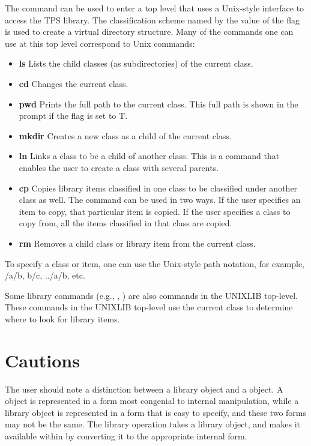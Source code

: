 The command  can be used to enter a top level
that uses a Unix-style interface to access the TPS library.
The classification scheme named by the value of the flag 
is used to create a virtual directory structure.  Many of the commands one
can use at this top level correspond to Unix commands:

\begin{itemize}
\item {\bf ls}  Lists the child classes (as subdirectories) of the current class.

\item {\bf cd}  Changes the current class.

\item {\bf pwd}  Prints the full path to the current class.
This full path is shown in the prompt if the flag 
is set to T.

\item {\bf mkdir}  Creates a new class as a child of the current class.

\item {\bf ln}  Links a class to be a child of another class.  This is a
command that enables the user to create a class with several parents.

\item {\bf cp}  Copies library items classified in one class to be classified
under another class as well.  The  command can be
used in two ways.  If the user specifies an item to copy, that
particular item is copied.  If the user specifies a class to copy from,
all the items classified in that class are copied.

\item {\bf rm}  Removes a child class or library item from the current class.

\end{itemize}

To specify a class or item, one can use the Unix-style path notation,
for example, /a/b, b/c, ../a/b, etc.

Some library commands (e.g., , )
are also commands in the UNIXLIB top-level.  These commands
in the UNIXLIB top-level use the current class to determine where
to look for library items.

\section{Cautions}
The user should note a distinction between a library object and a {\TPS}
object. A {\TPS} object is represented in a form most congenial to internal
manipulation, while a library object is represented in a form that
is easy to specify, and these two forms may not be the same. The library
operation  takes a library object, and makes it
available within {\TPS}{by converting it to the appropriate internal form.}


